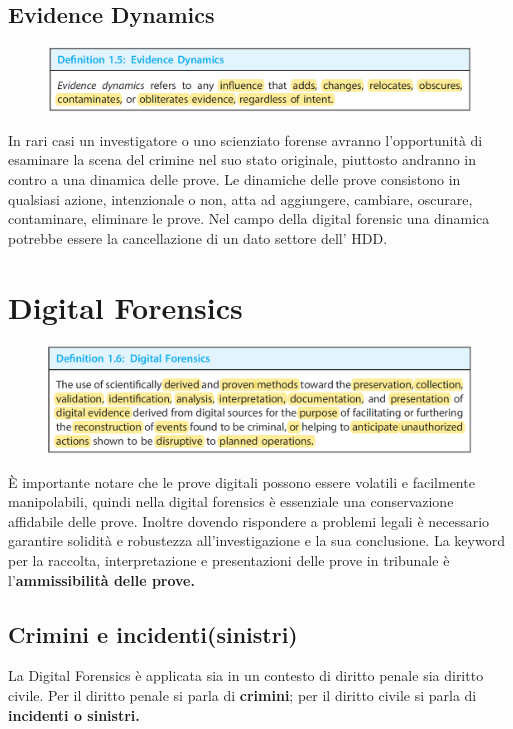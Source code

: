 \subsection{Evidence Dynamics}
\begin{figure}[h]
    \includegraphics[width=\textwidth]{Capitolo 1/Figure/evidence-dynamic.png}
\end{figure}
In rari casi un investigatore o uno scienziato forense avranno l'opportunità di esaminare la scena del crimine nel suo stato originale, piuttosto andranno in contro a una dinamica delle prove.
Le dinamiche delle prove consistono in qualsiasi azione, intenzionale o non, atta ad aggiungere, cambiare, oscurare, contaminare, eliminare le prove.
Nel campo della digital forensic una dinamica potrebbe essere la cancellazione di un dato settore dell' HDD.

\clearpage
\section{Digital Forensics}
\begin{figure}[h]
    \includegraphics[width=\textwidth]{Capitolo 1/Figure/digital-forensics-def.png}
\end{figure}
È importante notare che le prove digitali possono essere volatili e facilmente manipolabili, quindi nella digital forensics è essenziale una conservazione affidabile delle prove.
Inoltre dovendo rispondere a problemi legali è necessario garantire solidità e robustezza all'investigazione e la sua conclusione.
La keyword per la raccolta, interpretazione e presentazioni delle prove in tribunale è l'\textbf{ammissibilità delle prove.}

\subsection{Crimini e incidenti(sinistri)}
La Digital Forensics è applicata sia in un contesto di diritto penale sia diritto civile. Per il diritto penale si parla di \textbf{crimini}; per il diritto civile si parla di \textbf{incidenti o sinistri.}

